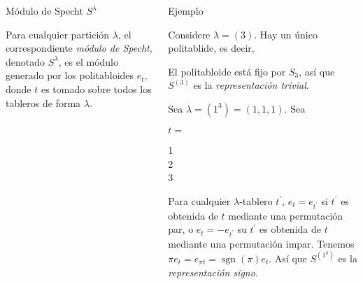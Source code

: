 \documentclass[final,xcolor=svgnames]{beamer}
\DeclareMathOperator{\sgn}{sgn}
\begin{document}
\begin{frame}{}
\begin{columns}
\begin{column}{0.5\textwidth}
      \begin{block}{Módulo de Specht $S^{\lambda}$}
        \begin{scriptsize}
          Para cualquier partición $\lambda$, el correspondiente
          \textit{módulo de Specht}, denotado $S^{\lambda}$, es el
          módulo generado por los politabloides $e_{t}$, donde $t$ es tomado sobre todos los tableros de forma $\lambda$.
        \end{scriptsize}
      \end{block}     
    \end{column}

    \begin{column}{0.5\textwidth}
      
      \begin{block}{Ejemplo}
        \begin{scriptsize}
            Considere $\lambda=(3)$. Hay un único politablide, es decir,
            \begin{center}
            \end{center}
            El politabloide está fijo por $S_{3}$, así que $S^{(3)}$ es la
            \textit{representación trivial}.
        
            Sea $\lambda=(1^{3})=(1,1,1)$. Sea
            \begin{center}$t=$
              \begin{ytableau}
                1\\
                2\\
                3
              \end{ytableau}
            \end{center}
            Para cualquier $\lambda$-tablero $t^{'}$,
            $e_{t}=e_{t^{'}}$ si $t^{'}$ es obtenida de $t$ mediante
            una permutación par, o $e_{t}=-e_{t^{'}}$ su $t^{'}$ es
            obtenida de $t$ mediante una permutación impar. Tenemos $\pi
            e_{t}=e_{\pi t}=\sgn(\pi)e_{t}$. Así que $S^{(1^{3})}$ es la
            \textit{representación signo}.
         

\end{scriptsize}
\end{block}
\end{column}
\end{columns}
\end{frame}
\end{document}
